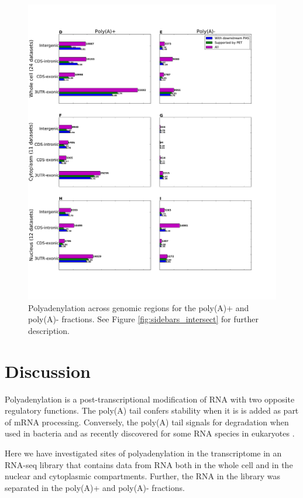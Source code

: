 \begin{figure}[hb]
	\begin{center}
		\includegraphics[scale=0.35]{figures/polyadenylation/Sidebars_pA_2+.pdf}
	\end{center}
	\caption{Polyadenylation across genomic regions for the poly(A)+ and poly(A)-
	fractions. See Figure \ref{fig:sidebars_intersect} for further description.}
	\label{fig:sidebars}
\end{figure}

\section{Discussion}
Polyadenylation is a post-transcriptional modification of RNA with two opposite
regulatory functions. The poly(A) tail confers stability when it is is added as
part of mRNA processing. Conversely, the poly(A) tail signals for degradation
when used in bacteria and as recently discovered for some RNA species in
eukaryotes \cite{shcherbik_polyadenylation_2010}.

Here we have investigated sites of polyadenylation in the transcriptome in an
RNA-seq library that contains data from RNA both in the whole cell and in the
nuclear and cytoplasmic compartments. Further, the RNA in the library was
separated in the poly(A)+ and poly(A)- fractions.

